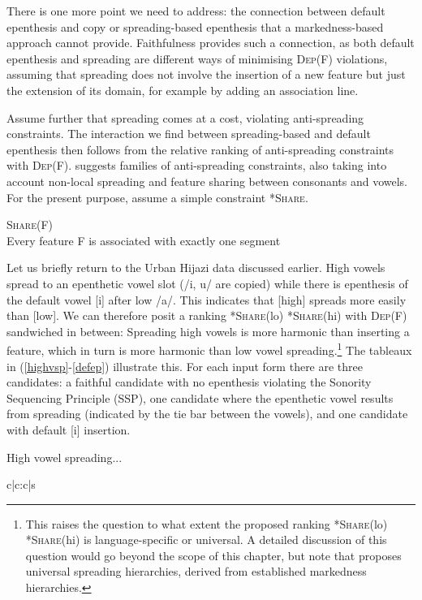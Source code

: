 \documentclass[output=paper,colorlinks,citecolor=brown]{langscibook}
\begin{document}
There is one more point we need to address: the connection between default epenthesis and copy or spreading-based epenthesis that a markedness-based approach cannot provide. Faithfulness provides such a connection, as both default epenthesis and spreading are different ways of minimising \textsc{Dep}(F) violations, assuming that spreading does not involve the insertion of a new feature but just the extension of its domain, for example by adding an association line.

Assume further that spreading comes at a cost, violating anti-spreading constraints. The interaction we find between spreading-based and default epen\-thesis then follows from the relative ranking of anti-spreading constraints with \textsc{Dep(F)}. \citet{uff06, uffbook} suggests families of anti-spreading constraints, also taking into account non-local spreading and feature sharing between consonants and vowels. For the present purpose, assume a simple constraint *\textsc{Share}.

\ea *\textsc{Share}(F) \\ Every feature F is associated with exactly one segment 
\z

Let us briefly return to the Urban Hijazi data discussed earlier. High vowels spread to an epenthetic vowel slot (/i, u/ are copied) while there is epenthesis of the default vowel [i] after low /a/. This indicates that [high] spreads more easily than [low]. We can therefore posit a ranking *\textsc{Share}(lo) \frqq{} *\textsc{Share}(hi) with \textsc{Dep}(F) sandwiched in between: Spreading high vowels is more harmonic than inserting a feature, which in turn is more harmonic than low vowel spreading.\footnote{This raises the question to what extent the proposed ranking *\textsc{Share}(lo) \frqq{} *\textsc{Share}(hi) is language-specific or universal. A detailed discussion of this question would go beyond the scope of this chapter, but note that \citet{uffbook} proposes universal spreading hierarchies, derived from established markedness hierarchies.} The tableaux in (\ref{highvsp}-\ref{defep}) illustrate this. For each input form there are three candidates: a faithful candidate with no epenthesis violating the Sonority Sequencing Principle (SSP), one candidate where the epenthetic vowel results from spreading (indicated by the tie bar between the vowels), and one candidate with default [i] insertion.

\begin{table}
\caption{High vowel spreading...}
\label{highvsp}
\ShadingOn
\begin{tableau}{c|c:c|s} 
         
\cand{[ʃukr]}              \vio{*!}  \vio{} \vio{}                                           \vio{}  
\cand[\Optimal]{[ʃukur]}   \vio{}  \vio{} \vio{}                                   \vio{*}     
\cand{[ʃukir]}    \vio{}  \vio{} \vio{*!}                                       \vio{}   

\end{tableau}
\end{table}
\end{document}
